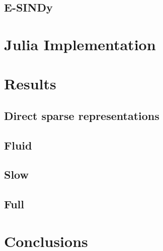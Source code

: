 \documentclass[
]{article}
\begin{document}
\subsection{E-SINDy}\label{e-sindy}

\section{Julia Implementation}\label{julia-implementation}

\section{Results}\label{results}

\subsection{Direct sparse
representations}\label{direct-sparse-representations}

\subsection{Fluid}\label{fluid}

\subsection{Slow}\label{slow}

\subsection{Full}\label{full}

\section{Conclusions}\label{conclusions}


\printbibliography
\end{document}
